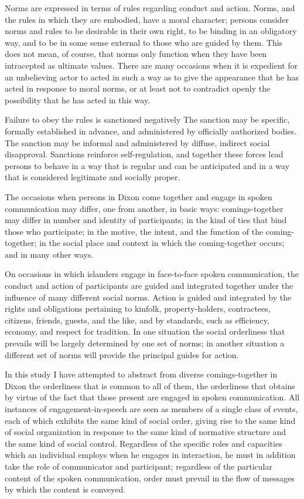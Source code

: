 \documentclass[twoside,symmetric,nobib,justified]{tufte-book}
\begin{document}
Norms are expressed in terms of rules regarding conduct and action.
Norms, and the rules in which they are embodied, have a moral character;
persons consider norms and rules to be desirable in their own right, to
be binding in an obligatory way, and to be in some sense external to
those who are guided by them. This does not mean, of course, that norms
only function when they have been intracepted as ultimate values. There
are many occasions when it is expedient for an unbelieving actor to
acted in such a way as to give the appearance that he has acted in
response to moral norms, or at least not to contradict openly the
possibility that he has acted in this way.

Failure to obey the rules is sanctioned negatively The sanction may be
specific, formally established in advance, and administered by
officially authorized bodies. The sanction may be informal and
administered by diffuse, indirect social disapproval. Sanctions
reinforce self-regulation, and together these forces lead persons to
behave in a way that is regular and can be anticipated and in a way that
is considered legitimate and socially proper.

The occasions when persons in Dixon come together and engage in spoken
communication may differ, one from another, in basic ways:
comings-together may differ in number and identity of participants; in
the kind of ties that bind those who participate; in the motive, the
intent, and the function of the coming-together; in the social place and
context in which the coming-together occurs; and in many other ways.

\newpage On occasions in which islanders engage in face-to-face spoken
communication, the conduct and action of participants are guided and
integrated together under the influence of many different social norms.
Action is guided and integrated by the rights and obligations pertaining
to kinfolk, property-holders, contractees, citizens, friends, guests,
and the like, and by standards, such as efficiency, economy, and respect
for tradition. In one situation the social orderliness that prevails
will be largely determined by one set of norms; in another situation a
different set of norms will provide the principal guides for action.

In this study I have attempted to abstract from diverse comings-together
in Dixon the orderliness that is common to all of them, the orderliness
that obtains by virtue of the fact that those present are engaged in
spoken communication. All instances of engagement-in-speech are seen as
members of a single class of events, each of which exhibits the same
kind of social order, giving rise to the same kind of social
organization in response to the same kind of normative structure and the
same kind of social control. Regardless of the specific roles and
capacities which an individual employs when he engages in interaction,
he must in addition take the role of communicator and participant;
regardless of the particular content of the spoken communication, order
must prevail in the flow of messages by which the content is conveyed.
\end{document}
